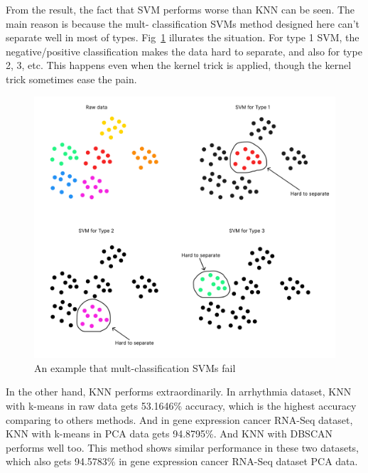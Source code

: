 \documentclass[twocolumn,10pt]{article}
\begin{document}
  From the result, the fact that SVM performs worse than KNN can be seen. The main reason is because the mult- 
  classification SVMs method designed here can't separate well in most of types. Fig~\ref{fig:SVM_fail} illurates the 
  situation. For type 1 SVM, the negative/positive classification makes the data hard to separate, and also for type 
  2, 3, etc. This happens even when the kernel trick is applied, though the kernel trick sometimes ease the pain. 
  \begin{figure}[htb]
    \centering
    \includegraphics[scale=0.15]{assets/SVM_fail.pdf}
    \caption{An example that mult-classification SVMs fail}
    \label{fig:SVM_fail}
  \end{figure}

  In the other hand, KNN performs extraordinarily. In arrhythmia dataset, KNN with k-means in raw data gets 53.1646\% 
  accuracy, which is the highest accuracy comparing to others methods. And in gene expression cancer RNA-Seq dataset, 
  KNN with k-means in PCA data gets 94.8795\%. And KNN with DBSCAN performs well too. This method shows similar performance 
  in these two datasets, which also gets 94.5783\% in gene expression cancer RNA-Seq dataset PCA data. 
\end{document}
